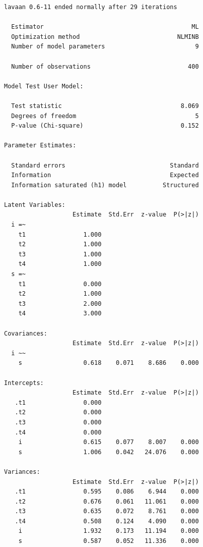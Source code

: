 \begin{verbatim}
lavaan 0.6-11 ended normally after 29 iterations

  Estimator                                         ML
  Optimization method                           NLMINB
  Number of model parameters                         9
                                                      
  Number of observations                           400
                                                      
Model Test User Model:
                                                      
  Test statistic                                 8.069
  Degrees of freedom                                 5
  P-value (Chi-square)                           0.152

Parameter Estimates:

  Standard errors                             Standard
  Information                                 Expected
  Information saturated (h1) model          Structured

Latent Variables:
                   Estimate  Std.Err  z-value  P(>|z|)
  i =~                                                
    t1                1.000                           
    t2                1.000                           
    t3                1.000                           
    t4                1.000                           
  s =~                                                
    t1                0.000                           
    t2                1.000                           
    t3                2.000                           
    t4                3.000                           

Covariances:
                   Estimate  Std.Err  z-value  P(>|z|)
  i ~~                                                
    s                 0.618    0.071    8.686    0.000

Intercepts:
                   Estimate  Std.Err  z-value  P(>|z|)
   .t1                0.000                           
   .t2                0.000                           
   .t3                0.000                           
   .t4                0.000                           
    i                 0.615    0.077    8.007    0.000
    s                 1.006    0.042   24.076    0.000

Variances:
                   Estimate  Std.Err  z-value  P(>|z|)
   .t1                0.595    0.086    6.944    0.000
   .t2                0.676    0.061   11.061    0.000
   .t3                0.635    0.072    8.761    0.000
   .t4                0.508    0.124    4.090    0.000
    i                 1.932    0.173   11.194    0.000
    s                 0.587    0.052   11.336    0.000
\end{verbatim}

